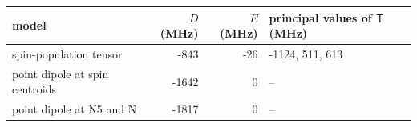 \begin{tabular}{lrrl}
\toprule
model & $D$ (MHz) & $E$ (MHz) & principal values of $\mathsf T$ (MHz) \\
\midrule
spin-population tensor & -843 & -26 & -1124, 511, 613 \\
point dipole at spin centroids & -1642 & 0 & -- \\
point dipole at N5 and N & -1817 & 0 & -- \\
\bottomrule
\end{tabular}

